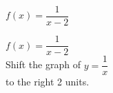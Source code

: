 {$f(x) = \dfrac{1}{x - 2}$ }
{$f(x) = \dfrac{1}{x - 2}$\\
Shift the graph of $y = \dfrac{1}{x}$ \\
to the right 2 units.


\begin{center}
\end{center}}
